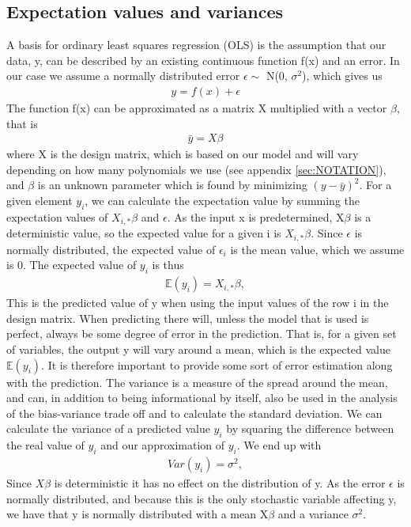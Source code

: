 \documentclass[english,notitlepage,reprint,nofootinbib]{revtex4-1}  %
\begin{document}
\subsection{Expectation values and variances}
\label{subsec: Example}
A basis for ordinary least squares regression (OLS) is the assumption that our data, y, can be described by an existing continuous function f(x) and an error. In our case we assume a normally distributed error $\epsilon \sim$  N(0, $\sigma^2$), which gives us 
\begin{align}
    y = f(x) + \epsilon
\end{align} \label{1}
The function f(x) can be approximated as a matrix X multiplied with a vector $\beta$, that is
\begin{align}
    \bar{y} = X\beta
\end{align}
where X is the design matrix, which is based on our model and will vary depending on how many polynomials we use (see appendix \ref{sec:NOTATION}), and $\beta$ is an unknown parameter which is found by minimizing $(y - \bar{y})^2$. For a given element $y_{i}$, we can calculate the expectation value by summing the expectation values of $X_{i,*}\beta$ and $\epsilon$. As the input x is predetermined, X$\beta$ is a deterministic value, so the expected value for a given i is $X_{i,*}\beta$. Since $\epsilon$ is normally distributed, the expected value of $\epsilon_{i}$ is the mean value, which we assume is 0. The expected value of $y_{i}$ is thus 
\begin{align}
    \mathbb{E}(y_{i}) = X_{i,*}\beta,
\end{align}
 This is the predicted value of y when using the input values of the row i in the design matrix. When predicting there will, unless the model that is used is perfect, always be some degree of error in the prediction. That is, for a given set of variables, the output y will vary around a mean, which is the expected value $\mathbb{E}(y_{i})$. It is therefore important to provide some sort of error estimation along with the prediction. The variance is a measure of the spread around the mean, and can, in addition to being informational by itself, also be used in the analysis of the bias-variance trade off and to calculate the standard deviation. We can calculate the variance of a predicted value $y_{i}$ by squaring the difference between the real value of $y_{i}$ and our approximation of $y_{i}$. We end up with
\begin{align}
    Var(y_{i}) = \sigma^2,
\end{align}
Since $X\beta$ is deterministic it has no effect on the distribution of y. As the error $\epsilon$ is normally distributed, and because this is the only stochastic variable affecting y, we have that y is normally distributed with a mean X$\beta$ and a variance $\sigma^2$.\\
\end{document}
